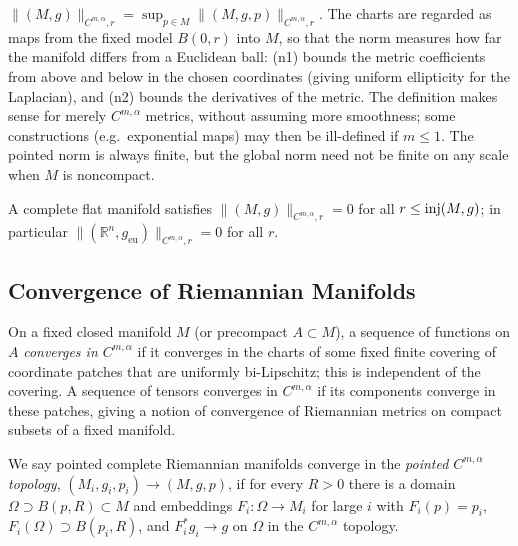 \begin{definition}
  \label{def:pet-ch11-cmalpha-norm-global}
  $\|(M,g)\|_{C^{m,\alpha},r}=\sup_{p\in M}\|(M,g,p)\|_{C^{m,\alpha},r}$. The
  charts are regarded as maps from the fixed model $B(0,r)$ into $M$, so that
  the norm measures how far the manifold differs from a Euclidean ball: (n1)
  bounds the metric coefficients from above and below in the chosen
  coordinates (giving uniform ellipticity for the Laplacian), and (n2)
  bounds the derivatives of the metric. The definition makes sense for
  merely $C^{m,\alpha}$ metrics, without assuming more smoothness; some
  constructions (e.g.\ exponential maps) may then be ill-defined if $m\le1$.
  The pointed norm is always finite, but the global norm need not be finite
  on any scale when $M$ is noncompact.
\end{definition}

\begin{example}
  \label{ex:pet-ch11-flat-manifold-norm-zero}
  A complete flat manifold satisfies $\|(M,g)\|_{C^{m,\alpha},r}=0$
  for all $r\le\operatorname{inj}(M,g)$; in particular
  $\|(\mathbb{R}^n,g_{\mathrm{eu}})\|_{C^{m,\alpha},r}=0$ for all $r$.
\end{example}

\subsection{Convergence of Riemannian Manifolds}

\begin{definition}
  \label{def:pet-ch11-tensor-convergence-compact-subset}
  On a fixed closed manifold $M$ (or precompact $A\subset M$), a sequence
  of functions on $A$ \emph{converges in $C^{m,\alpha}$} if it converges in
  the charts of some fixed finite covering of coordinate patches that are
  uniformly bi-Lipschitz; this is independent of the covering. A sequence of
  tensors converges in $C^{m,\alpha}$ if its components converge in these
  patches, giving a notion of convergence of Riemannian metrics on compact
  subsets of a fixed manifold.
\end{definition}

\begin{definition}
  \label{def:pet-ch11-pointed-cmalpha-convergence}
  We say pointed complete Riemannian manifolds converge in the
  \emph{pointed $C^{m,\alpha}$ topology}, $(M_i,g_i,p_i)\to(M,g,p)$, if for
  every $R>0$ there is a domain $\Omega\supset B(p,R)\subset M$ and
  embeddings $F_i:\Omega\to M_i$ for large $i$ with $F_i(p)=p_i$,
  $F_i(\Omega)\supset B(p_i,R)$, and $F_i^*g_i\to g$ on $\Omega$ in the
  $C^{m,\alpha}$ topology.
\end{definition}


